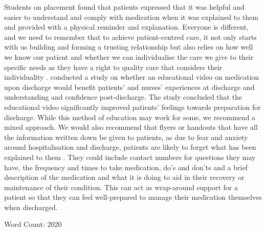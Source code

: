 \documentclass[british,12pt,a4paper]{article}
\begin{document}
Students on placement found that patients expressed that it was helpful and easier to understand and comply with medication when it was explained to them and provided with a physical reminder and explanation. Everyone is different, and we need to remember that to achieve patient-centred care, it not only starts with us building and forming a trusting relationship but also relies on how well we know our patient and whether we can individualise the care we give to their specific needs as they have a right to quality care that considers their individuality \parencite{NZNC2012}. \textcite{Sanjai2019} conducted a study on whether an educational video on medication upon discharge would benefit patients' and nurses' experiences at discharge and understanding and confidence post-discharge. The study concluded that the educational video significantly improved patients' feelings towards preparation for discharge. While this method of education may work for some, we recommend a mixed approach. We would also recommend that flyers or handouts that have all the information written down be given to patients, as due to fear and anxiety around hospitalisation and discharge, patients are likely to forget what has been explained to them \parencite{Roeung2024}. They could include contact numbers for questions they may have, the frequency and times to take medication, do's and don'ts and a brief description of the medication and what it is doing to aid in their recovery or maintenance of their condition. This can act as wrap-around support for a patient so that they can feel well-prepared to manage their medication themselves when discharged.

\vfill
\begin{center}
	\large Word Count: 2020
\end{center}
\pagebreak
\doublespacing
\printbibliography
\end{document}
